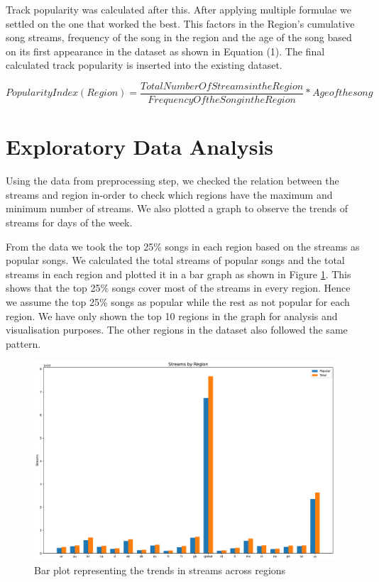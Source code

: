 \documentclass{article}
\begin{document}
Track popularity was calculated after this. After applying multiple formulae we settled on the one that worked the best. This factors in the Region's cumulative song streams, frequency of the song in the region and the age of the song based on its first appearance in the dataset as shown in Equation (1). The final calculated track popularity is inserted into the existing dataset.   

\begin{equation}
    Popularity Index (Region) = \frac{Total Number Of Streams in the Region}{Frequency Of the Song in the Region} * Age of the song
\end{equation}


\section{Exploratory Data Analysis}

Using the data from preprocessing step, we checked the relation between the streams and region in-order to check which regions have the maximum and minimum number of streams. We also plotted a graph to observe the trends of streams for days of the week.

From the data we took the top 25\% songs in each region based on the streams as popular songs. We calculated the total streams of popular songs and the total streams in each region and plotted it in a bar graph as shown in Figure \ref{fig:Barplot}. This shows that the top 25\% songs cover most of the streams in every region. Hence we assume the top 25\% songs as popular while the rest as not popular for each region.
We have only shown the top 10 regions in the graph for analysis and visualisation purposes. The other regions in the dataset also followed the same pattern.

\begin{figure}[htbp]
    \centering
    \includegraphics[scale = 0.25]{Figures/Region_streams.pdf}
    \caption{Bar plot representing the trends in streams across regions}
    \label{fig:Barplot}
\end{figure} 
\end{document}
